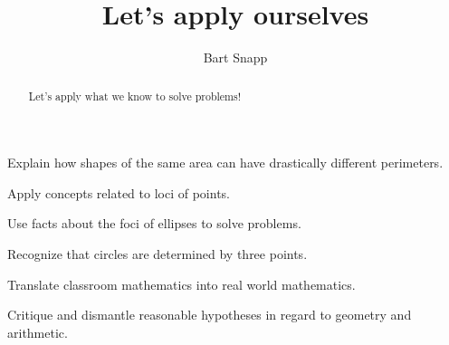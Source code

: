 \documentclass[nooutcomes,noauthor,hints,handout]{ximera}
\title{Let's apply ourselves}
\author{Bart Snapp}
\begin{document}
\begin{abstract}
  Let's apply what we know to solve problems!
\end{abstract}
\maketitle


\begin{listOutcomes}
\item Explain how shapes of the same area can have drastically
  different perimeters.
\item Apply concepts related to loci of points.
\item Use facts about the foci of ellipses to solve problems.    
\item Recognize that circles are determined by three points.
\item Translate classroom mathematics into real world mathematics. 
\item Critique and dismantle reasonable hypotheses in regard to geometry and arithmetic.
\end{listOutcomes}


\mynewpage
\end{document}
